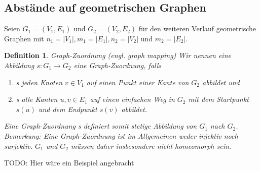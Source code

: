 \documentclass[a4paper, 12pt, twoside]{article}
\theoremstyle{Format1} %
\newtheorem{Def}{Definition}[section]       %
\begin{document}
\subsection{Abstände auf geometrischen Graphen}

Seien $ G_1=(V_1, E_1) $ und $ G_2=(V_2, E_2) $ für den weiteren Verlauf geometrische Graphen mit
$n_1 = |V_1|, m_1 = |E_1|, n_2 = |V_2|$ und $m_2 = |E_2|$.
\begin{Def}
	Graph-Zuordnung (engl. graph mapping)
	Wir nennen eine Abbildung $s: G_1 \to G_2 $ eine \textit{Graph-Zuordnung}, falls
    	\begin{enumerate}
		\item[1)] s jeden Knoten $ v \in V_1 $ auf einen Punkt einer Kante von $ G_2 $ abbildet und
		\item[2)] s alle Kanten $ {u,v} \in E_1 $ auf einen einfachen Weg in $G_2$ mit dem Startpunkt $s(u)$ und dem Endpunkt $s(v)$ abbildet.
    	\end{enumerate}

	Eine Graph-Zuordnung s definiert somit stetige Abbildung von $ G_1 $ nach $ G_2 $.\\
	Bemerkung: Eine Graph-Zuordnung ist im Allgemeinen weder injektiv noch surjektiv.
	$ G_1 $ und $ G_2 $ müssen daher insbesondere nicht homeomorph sein.

\end{Def}

TODO: Hier wäre ein Beispiel angebracht
\end{document}
